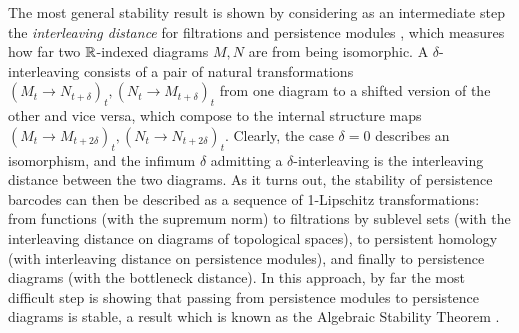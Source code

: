 The most general stability result is shown by considering as an intermediate step the \emph{interleaving distance} for filtrations and persistence modules \cite{MR2279866}, which measures how far two $\mathbb{R}$-indexed diagrams $M,N$ are from being isomorphic.
A $\delta$-interleaving consists of a pair of natural transformations $(M_t \to N_{t+\delta})_t, (N_t \to M_{t+\delta})_t$ from one diagram to a shifted version of the other and vice versa, which compose to the internal structure maps $(M_t \to M_{t+2\delta})_t, (N_t \to N_{t+2\delta})_t$. Clearly, the case $\delta=0$ describes an isomorphism, and the infimum $\delta$ admitting a $\delta$-interleaving is the interleaving distance between the two diagrams.
As it turns out, the stability of persistence barcodes can then be described as a sequence of 1-Lipschitz transformations: from functions (with the supremum norm) to filtrations by sublevel sets (with the interleaving distance on diagrams of topological spaces), to persistent homology (with interleaving distance on persistence modules), and finally to persistence diagrams (with the bottleneck distance).
In this approach, by far the most difficult step is showing that passing from persistence modules to persistence diagrams is stable, a result which is known as the Algebraic Stability Theorem  \cite{10.1145/1542362.1542407,Chazal.2016a,MR3333456}.

